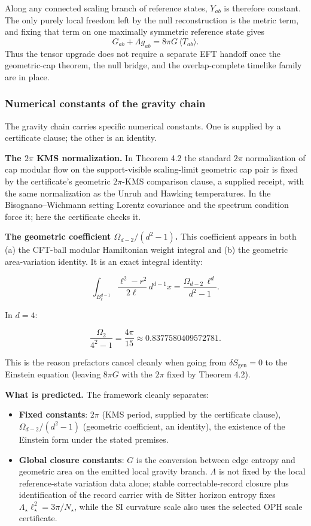 Along any connected scaling branch of reference states, \(Y_{ab}\) is therefore constant. The only purely local freedom left by the null reconstruction is the metric term, and fixing that term on one maximally symmetric reference state gives
\[
G_{ab}+\Lambda g_{ab}=8\pi G\,\langle T_{ab}\rangle.
\]
Thus the tensor upgrade does not require a separate EFT handoff once the geometric-cap theorem, the null bridge, and the overlap-complete timelike family are in place.

\subsubsection{Numerical constants of the gravity chain}\label{58-non-tunable-numerical-constants}

The gravity chain carries specific numerical constants. One is supplied by a certificate clause; the other is an identity.

\textbf{The \(2\pi\) KMS normalization.} In Theorem 4.2 the standard \(2\pi\) normalization of cap modular flow on the support-visible scaling-limit geometric cap pair is fixed by the certificate's geometric \(2\pi\)-KMS comparison clause, a supplied receipt, with the same normalization as the Unruh and Hawking temperatures. In the Bisognano--Wichmann setting Lorentz covariance and the spectrum condition force it; here the certificate checks it.

\textbf{The geometric coefficient \(\Omega_{d-2}/(d^2 - 1)\).} This coefficient appears in both (a) the CFT-ball modular Hamiltonian weight integral and (b) the geometric area-variation identity. It is an exact integral identity:

\[
\int_{B^{d-1}_\ell} \frac{\ell^2 - r^2}{2\ell} \, d^{d-1}x
= \frac{\Omega_{d-2} \, \ell^d}{d^2 - 1}.
\]

In \(d = 4\):

\[
\frac{\Omega_2}{4^2 - 1} = \frac{4\pi}{15} \approx 0.8377580409572781.
\]

This is the reason prefactors cancel cleanly when going from \(\delta S_{\mathrm{gen}} = 0\) to the Einstein equation (leaving \(8\pi G\) with the \(2\pi\) fixed by Theorem 4.2).

\textbf{What is predicted.} The framework cleanly separates:

\begin{itemize}
\tightlist
\item
  \textbf{Fixed constants}: \(2\pi\) (KMS period, supplied by the certificate clause), \(\Omega_{d-2}/(d^2-1)\) (geometric coefficient, an identity), the existence of the Einstein form under the stated premises.
\item
  \textbf{Global closure constants}: \(G\) is the conversion between edge entropy and geometric area on the emitted local gravity branch. \(\Lambda\) is not fixed by the local reference-state variation data alone; stable correctable-record closure plus identification of the record carrier with de Sitter horizon entropy fixes \(\Lambda_\star\ell_\star^2=3\pi/N_\star\), while the SI curvature scale also uses the selected OPH scale certificate.
\end{itemize}

